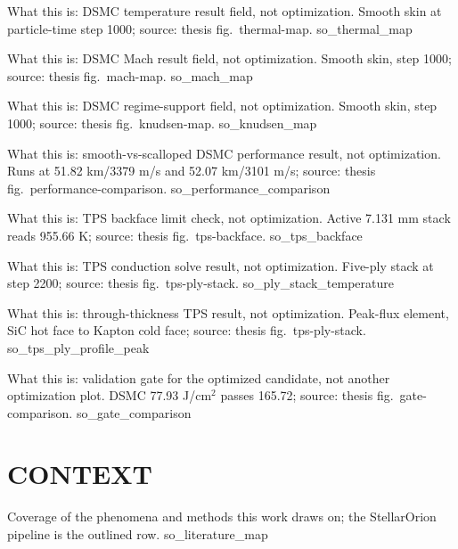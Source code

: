 \documentclass[aspectratio=169,11pt]{beamer}
\begin{document}
  {%
   What this is: DSMC temperature result field, not optimization.
   Smooth skin at particle-time step 1000; source: thesis fig.~thermal-map.}
  {so_thermal_map}

  {%
   What this is: DSMC Mach result field, not optimization.
   Smooth skin, step 1000; source: thesis fig.~mach-map.}
  {so_mach_map}

  {%
   What this is: DSMC regime-support field, not optimization.
   Smooth skin, step 1000; source: thesis fig.~knudsen-map.}
  {so_knudsen_map}

  {%
   What this is: smooth-vs-scalloped DSMC performance result, not optimization.
   Runs at 51.82 km/3379 m/s and 52.07 km/3101 m/s; source: thesis
   fig.~performance-comparison.}
  {so_performance_comparison}

  {%
   What this is: TPS backface limit check, not optimization.
   Active 7.131 mm stack reads 955.66 K; source: thesis fig.~tps-backface.}
  {so_tps_backface}

  {%
   What this is: TPS conduction solve result, not optimization.
   Five-ply stack at step 2200; source: thesis fig.~tps-ply-stack.}
  {so_ply_stack_temperature}

  {%
   What this is: through-thickness TPS result, not optimization.
   Peak-flux element, SiC hot face to Kapton cold face; source: thesis
   fig.~tps-ply-stack.}
  {so_tps_ply_profile_peak}

  {%
   What this is: validation gate for the optimized candidate, not another
   optimization plot. DSMC 77.93 J/cm$^2$ passes 165.72; source: thesis
   fig.~gate-comparison.}
  {so_gate_comparison}


\section{CONTEXT}

  {%
   Coverage of the phenomena and methods this work draws on; the
   StellarOrion pipeline is the outlined row.}
  {so_literature_map}
\end{document}
